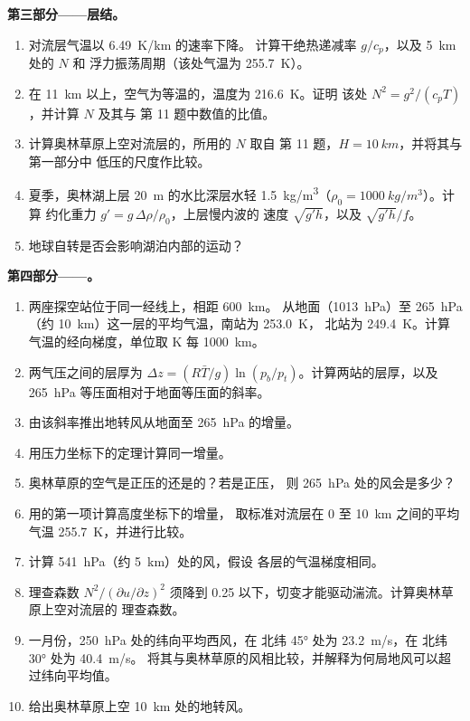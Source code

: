 \begin{problem}
\medskip\noindent\textbf{第三部分——层结。}
\begin{enumerate}[resume]
\item 对流层气温以 \qty{6.49}{K/km} 的速率下降。
  计算干绝热递减率 $g/c_p$，以及 \qty{5}{km} 处的 $N$ 和
  浮力振荡周期（该处气温为
  \qty{255.7}{K}）。
\item 在 \qty{11}{km} 以上，空气为等温的，温度为 \qty{216.6}{K}。证明
  该处 $N^2 = g^2/(c_pT)$，并计算 $N$ 及其与
  第 11 题中数值的比值。
\item 计算奥林草原上空对流层的，所用的 $N$ 取自
  第 11 题，$H = \qty{10}{km}$，并将其与第一部分中
  低压的尺度作比较。
\item 夏季，奥林湖上层 \qty{20}{m} 的水比深层水轻
  \qty{1.5}{kg/m^3}（$\rho_0 = \qty{1000}{kg/m^3}$）。计算
  约化重力 $g' = g\,\Delta\rho/\rho_0$，上层慢内波的
  速度 $\sqrt{g'h}$，以及
  $\sqrt{g'h}/f$。
\item 地球自转是否会影响湖泊内部的运动？
\end{enumerate}

\medskip\noindent\textbf{第四部分——。}
\begin{enumerate}[resume]
\item 两座探空站位于同一经线上，相距 \qty{600}{km}。
  从地面（\qty{1013}{hPa}）至
  \qty{265}{hPa}（约 \qty{10}{km}）这一层的平均气温，南站为 \qty{253.0}{K}，
  北站为 \qty{249.4}{K}。计算
  气温的经向梯度，单位取 \unit{K} 每 \qty{1000}{km}。
\item 两气压之间的层厚为 $\Delta z = (R\bar
  T/g)\ln(p_b/p_t)$。计算两站的层厚，以及
  \qty{265}{hPa} 等压面相对于地面等压面的斜率。
\item 由该斜率推出地转风从地面至
  \qty{265}{hPa} 的增量。
\item 用压力坐标下的定理计算同一增量。
\item 奥林草原的空气是正压的还是的？若是正压，
  则 \qty{265}{hPa} 处的风会是多少？
\item 用的第一项计算高度坐标下的增量，
  取标准对流层在 0 至
  \qty{10}{km} 之间的平均气温 \qty{255.7}{K}，并进行比较。
\item 计算 \qty{541}{hPa}（约 \qty{5}{km}）处的风，假设
  各层的气温梯度相同。
\item 理查森数 $N^2/(\partial u/\partial z)^2$ 须降到
  0.25 以下，切变才能驱动湍流。计算奥林草原上空对流层的
  理查森数。
\item 一月份，\qty{250}{hPa} 处的纬向平均西风，在
北纬 \ang{45} 处为 \qty{23.2}{m/s}，在 北纬 \ang{30} 处为 \qty{40.4}{m/s}。
  将其与奥林草原的风相比较，并解释为何局地风可以超过纬向平均值。
\item 给出奥林草原上空 \qty{10}{km} 处的地转风。
\end{enumerate}
\end{problem}
